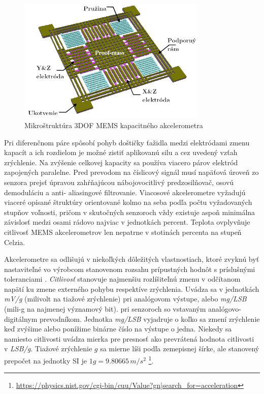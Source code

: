 \begin{figure}[h]
	\centering
	\includegraphics[width=0.8\textwidth]{figures/mems-accelerometer.png}
	\caption{Mikroštruktúra 3DOF MEMS kapacitného akcelerometra}
\end{figure}

Pri diferenčnom páre spôsobí pohyb doštičky ťažidla medzi elektródami zmenu kapacít a ich rozdielom je možné zistiť aplikovanú silu a
cez uvedený vzťah zrýchlenie. Na zvýšenie celkovej kapacity sa používa viacero párov elektród zapojených paralelne. Pred prevodom na
číslicový signál musí napäťová úroveň zo senzora prejsť úpravou zahŕňajúcou nábojovocitlivý predzosilňovač, osovú demoduláciu a anti-
aliasingové filtrovanie. Viacosové akcelerometre vyžadujú viaceré opísané štruktúry orientované kolmo na seba podľa počtu vyžadovaných
stupňov voľnosti, pričom v skutočných senzoroch vždy existuje aspoň minimálna závislosť medzi osami rádovo najviac v jednotkách
percent. Teplota ovplyvňuje citlivosť MEMS akcelerometrov len nepatrne v stotinách percenta na stupeň Celzia.

Akcelerometre sa odlišujú v niekoľkých dôležitých vlastnostiach, ktoré zvyknú byť nastaviteľné vo výrobcom stanovenom rozsahu
prípustných hodnôt s príslušnými toleranciami \cite{accelerometer-mechanics}.
\emph{Citlivosť} stanovuje najmenšiu rozlíšiteľnú zmenu v odčítanom napätí ku zmene externého pohybu respektíve zrýchlenia.
Uvádza sa v jednotkách \emph{mV/g} (milivolt na tiažové zrýchlenie) pri analógovom výstupe, alebo \emph{mg/LSB} (mili-g
na najmenej významový bit). pri senzoroch so vstavaným analógovo-digitálnym prevodníkom. Jednotka \emph{mg/LSB} vyjadruje
o koľko sa zmení zrýchlenie keď zvýšime alebo ponížime binárne číslo na výstupe o jedna. Niekedy sa namiesto
citlivosti uvádza mierka pre presnosť ako prevrátená hodnota citlivosti v \emph{LSB/g}. Tiažové zrýchlenie $g$ sa mierne líši podľa
zemepisnej šírke, ale stanovený prepočet na jednotky SI je $1 g = 9.80665\,m/s^2$
\footnote{\url{https://physics.nist.gov/cgi-bin/cuu/Value?gn|search_for=acceleration}}.


